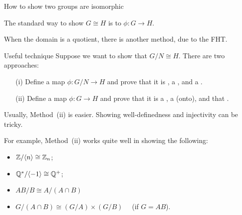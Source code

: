 \documentclass[8pt, handout]{beamer}
\newcommand{\Pause}{}      %
\begin{document}

\begin{frame}{How to show two groups are isomorphic}
  
  The standard way to show $G\cong H$ is to  $\phi\colon G\to H$.
  
  \medskip\Pause
  
  When the domain is a quotient, there is another method, due to the FHT. 
  
  \smallskip\Pause
  
  \begin{alertblock}{Useful technique}
    Suppose we want to show that $G/N\cong H$. There are two
    approaches: \Pause
    \begin{enumerate}
    \item[(i)] Define a map $\phi\colon G/N\to H$ and prove that it is
      , a , and a
      . \Pause
    \item[(ii)] Define a map $\phi\colon G\to H$ and prove that it is a
      , a  (onto), and
      that . 
    \end{enumerate}
  \end{alertblock}
  
  \smallskip\Pause
  
  Usually, Method~(ii) is easier. Showing well-definedness and
  injectivity can be tricky.
  
  \medskip\Pause
  
  For example, Method~(ii) works quite well in showing the
  following: \smallskip\Pause
  \begin{itemize}
  \item $\mathbb{Z}/\langle n\rangle\cong\mathbb{Z}_n$; \smallskip\Pause
  \item $\mathbb{Q}^*/\langle-1\rangle\cong\mathbb{Q}^+$; \smallskip\Pause
  \item $AB/B\cong A/(A\cap B)\quad$  \smallskip\Pause
  \item $G/(A\cap B)\cong (G/A)\times(G/B)\quad$ (if $G=AB$).
  \end{itemize}
  
\end{frame}

\end{document}
